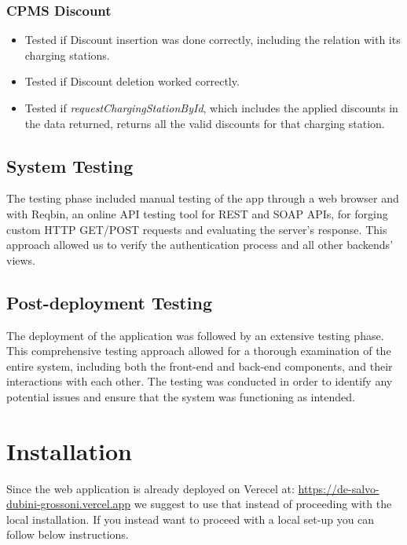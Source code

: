 \documentclass[table, 12pt]{article}
\begin{document}
\subsubsection*{CPMS Discount}
\begin{itemize}
    \item Tested if Discount insertion was done correctly, including the relation with its charging stations.
    \item Tested if Discount deletion worked correctly.
    \item Tested if \textit{requestChargingStationById}, which includes the applied discounts in the data returned, returns all the valid discounts for that charging station.
\end{itemize}
\subsection{System Testing}
The testing phase included manual testing of the app through a web browser and with Reqbin, 
an online API testing tool for REST and SOAP APIs, for forging custom HTTP GET/POST requests and evaluating the server's response. 
This approach allowed us to verify the authentication process and all other backends' views. 

\subsection{Post-deployment Testing}
The deployment of the application was followed by an extensive testing phase. 
This comprehensive testing approach allowed for a thorough examination of the entire system, including both the front-end and back-end components,
 and their interactions with each other. 
The testing was conducted in order to identify any potential issues and ensure that the system was functioning as intended. 



\section{Installation}
Since the web application is already deployed on Verecel at:\newline
\url{https://de-salvo-dubini-grossoni.vercel.app} we suggest to use that instead of proceeding with the local installation.
If you instead want to proceed with a local set-up you can follow below instructions.
\end{document}

